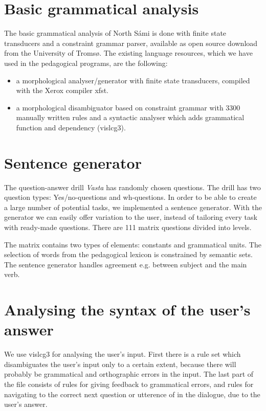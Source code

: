 \documentclass[11pt]{article}
\begin{document}
\section{Basic grammatical analysis}
The basic grammatical analysis of North Sámi is done with finite state transducers and a constraint grammar parser, available as open source download from the University of Tromsø. The existing language resources, which we have used in the pedagogical programs, are the following:

\begin{itemize}
\item a morphological analyser/generator with finite state transducers, compiled with the Xerox compiler xfst.  
\item a morphological disambiguator based on constraint grammar with 3300 manually written rules and a syntactic analyser which adds grammatical function and dependency (vislcg3). 
\end{itemize}


\section{Sentence generator}
The question-answer drill \textit{Vasta} has randomly chosen questions. The drill has two question types: Yes/no-questions and wh-questions. In order to be able to create a large number of potential tasks, we implemented a sentence generator. With the generator we can easily offer variation to the user, instead of tailoring every task with ready-made questions. There are 111 matrix questions divided into levels.

The matrix contains two types of elements: constants and grammatical units. The selection of words from the pedagogical lexicon is constrained by semantic sets. The sentence generator handles agreement e.g. between subject and the main verb.
 
\section{Analysing the syntax of the user's answer} 
We use vislcg3 for analysing the user's input. First there is a rule set which disambiguates the user's input only to a certain extent, because there will probably be grammatical and orthographic errors in the input. The last part of the file consists of rules for giving feedback to grammatical errors, and rules for navigating to the correct next question or utterence of in the dialogue, due to the user's answer.  
\end{document}
